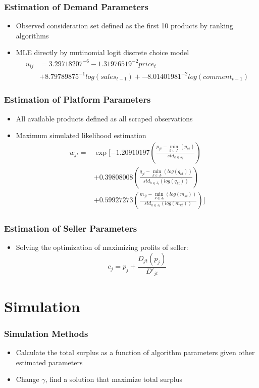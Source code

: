 \documentclass{beamer}
\begin{document}
\begin{frame}
\frametitle{Estimation of Demand Parameters}
\begin{itemize}
\item Observed consideration set defined as the first 10 products by ranking algorithms
\item MLE directly by mutinomial logit discrete choice model 
\begin{align*}
u_{ij} &= 3.29718207^{-6} -1.31976519^{-2} price_{t} \\
&+  8.79789875^{-1} log(sales_{t-1})+ -8.01401981^{-2} log(comment_{t-1})
\end{align*}
\end{itemize}
\end{frame}

\begin{frame}
\frametitle{Estimation of Platform Parameters}
\begin{itemize}
\item All available products defined as all scraped observations
\item Maximum simulated likelihood estimation
\begin{align*}
w_{jt}  = &\exp[-1.20910197 (\frac{p_{jt}-\min_{k \in J_t}(p_{kt})}{std_{k \in J_t}}) \\
&+ 0.39808008 (\frac{q_{jt}-\min_{k \in J_t}(log(q_{kt}))}{std_{k \in J_t}(log(q_{kt}))})  \\
&+ 0.59927273 (\frac{m_{jt}-\min_{k \in J_t}(log(m_{kt}))}{std_{k \in J_t}(log(m_{kt}))})  
]
\end{align*}
\end{itemize}
\end{frame}

\begin{frame}
\frametitle{Estimation of Seller Parameters}
\begin{itemize}
\item Solving the optimization of maximizing profits of seller:
$$
c_j = p_j + \frac{D_{jt}(p_j)}{D'_{jt}}
$$
\end{itemize}
\end{frame}

\section{Simulation}
\begin{frame}
\frametitle{Simulation Methods}
\begin{itemize}
\item Calculate the total surplus as a function of algorithm parameters given other estimated parameters
\item Change $\gamma$, find a solution that maximize total surplus
\end{itemize}
\end{frame}
\end{document}
